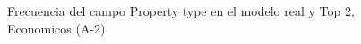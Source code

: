 \begin{figure}[H]
    \centering
    
    \caption{Frecuencia del campo Property type en el modelo real y Top 2, Economicos (A-2)}
    \label{frecuency-Property Type-top2}
\end{figure}